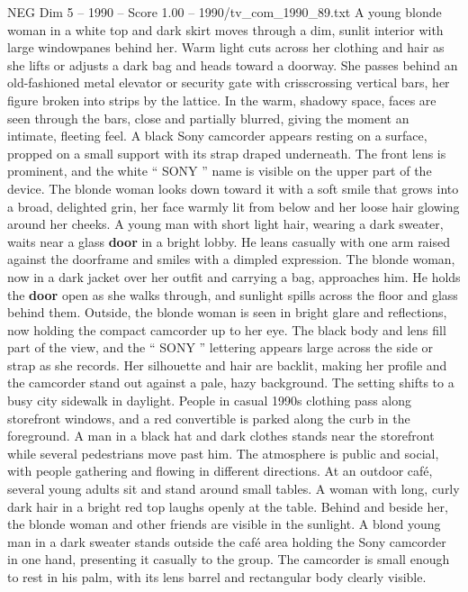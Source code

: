 \begin{textsample}{NEG Dim 5 – 1990 – Score 1.00 – 1990/tv\_com\_1990\_89.txt}  \label{ex:f5_neg_086}
A young blonde woman in a white top and dark skirt moves through a dim, sunlit interior with large windowpanes behind her.
Warm light cuts across her clothing and hair as she lifts or adjusts a dark bag and heads toward a doorway.
She passes behind an old-fashioned metal elevator or security gate with crisscrossing vertical bars, her figure broken into strips by the lattice.
In the warm, shadowy space, faces are seen through the bars, close and partially blurred, giving the moment an intimate, fleeting feel.
A black Sony camcorder appears resting on a surface, propped on a small support with its strap draped underneath.
The front lens is prominent, and the white “ SONY ” name is visible on the upper part of the device.
The blonde woman looks down toward it with a soft smile that grows into a broad, delighted grin, her face warmly lit from below and her loose hair glowing around her cheeks.
A young man with short light hair, wearing a dark sweater, waits near a glass \textbf{door} in a bright lobby.
He leans casually with one arm raised against the doorframe and smiles with a dimpled expression.
The blonde woman, now in a dark jacket over her outfit and carrying a bag, approaches him.
He holds the \textbf{door} open as she walks through, and sunlight spills across the floor and glass behind them.
Outside, the blonde woman is seen in bright glare and reflections, now holding the compact camcorder up to her eye.
The black body and lens fill part of the view, and the “ SONY ” lettering appears large across the side or strap as she records.
Her silhouette and hair are backlit, making her profile and the camcorder stand out against a pale, hazy background.
The setting shifts to a busy city sidewalk in daylight.
People in casual 1990s clothing pass along storefront windows, and a red convertible is parked along the curb in the foreground.
A man in a black hat and dark clothes stands near the storefront while several pedestrians move past him.
The atmosphere is public and social, with people gathering and flowing in different directions.
At an outdoor café, several young adults sit and stand around small tables.
A woman with long, curly dark hair in a bright red top laughs openly at the table.
Behind and beside her, the blonde woman and other friends are visible in the sunlight.
A blond young man in a dark sweater stands outside the café area holding the Sony camcorder in one hand, presenting it casually to the group.
The camcorder is small enough to rest in his palm, with its lens barrel and rectangular body clearly visible.

\end{textsample}
